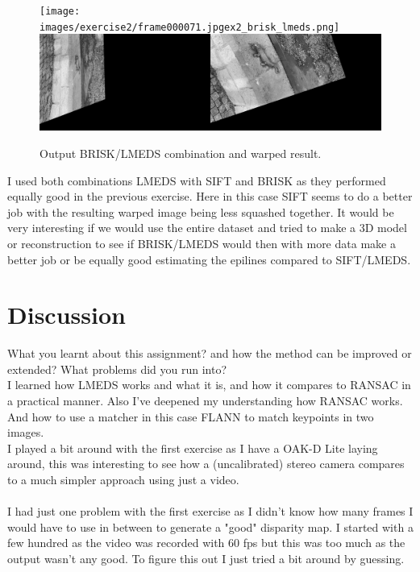 \documentclass[UTF-8]{article}
\begin{document}
\begin{enumerate}[a.]
		\begin{figure}[H]
			\centering
			\texttt{[image: images/exercise2/frame000071.jpgex2\_brisk\_lmeds.png]}
			\includegraphics[width=0.7\linewidth]{images/exercise2/frame000071.jpgex2_brisk_warped_lmeds.png}
			\caption{Output BRISK/LMEDS combination and warped result.}
			\label{fig:outpChallengeBRISK}
		\end{figure}
		
		I used both combinations LMEDS with SIFT and BRISK as they performed equally good in the previous exercise. Here in this case SIFT seems to do a better job with the resulting warped image being less squashed together. It would be very interesting if we would use the entire dataset and tried to make a 3D model or reconstruction to see if BRISK/LMEDS would then with more data make a better job or be equally good estimating the epilines compared to SIFT/LMEDS.
		
	\end{enumerate}
\newpage
	\section*{Discussion}
	What  you  learnt  about  this  assignment?  and  how  the  method  can  be 
	improved or extended? What problems did you run into?\\
	I learned how LMEDS works and what it is, and how it compares to RANSAC in a practical manner.
	Also I've deepened my understanding how RANSAC works. And how to use a matcher in this case FLANN to match keypoints in two images.\\
	I played a bit around with the first exercise as I have a OAK-D Lite laying around, this was interesting to see how a (uncalibrated) stereo camera compares to a much simpler approach using just a video.\\\\
	I had just one problem with the first exercise as I didn't know how many frames I would have to use in between to generate a "good" disparity map. I started with a few hundred as the video was recorded with 60 fps but this was too much as the output wasn't any good. To figure this out I just tried a bit around by guessing.
	
	
\end{document}
